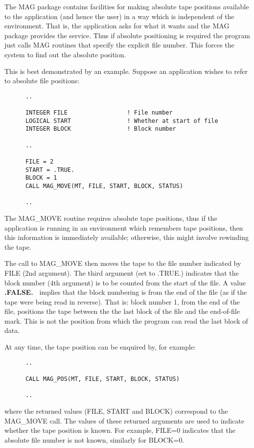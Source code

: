 The MAG package contains facilities for making absolute tape positions
available to the application (and hence the user) in a  way which is
independent of the environment. That is, the application asks for what
it wants and the MAG package provides the service. Thus if absolute
positioning is required the program just calls MAG routines that
specify the explicit file number. This forces the system to find
out the absolute position.

This is best demonstrated by an example. Suppose an application wishes
to refer to absolute file positions: 

\small
\begin{verbatim}
      ..

      INTEGER FILE                 ! File number
      LOGICAL START                ! Whether at start of file
      INTEGER BLOCK                ! Block number

      ..

      FILE = 2
      START = .TRUE.
      BLOCK = 1
      CALL MAG_MOVE(MT, FILE, START, BLOCK, STATUS)

      ..
\end{verbatim}
\normalsize

The MAG\_MOVE routine requires absolute tape positions, thus if the
application is running in an environment which remembers tape positions,
then this information is immediately available;  otherwise, this might
involve rewinding the tape. 

The call to MAG\_MOVE then moves the tape to the file number indicated by
FILE (2nd argument).
The third argument (set to .TRUE.) indicates that the block number
(4th argument) is to be counted from the start of the file.
A value {\bf .FALSE.\ } implies that the block numbering is from the end of the
file (as if the tape were being read in reverse). That is: block number 1,
from the end of the file, positions the tape between the the last block of
the file and the end-of-file mark. This is not the position from which the
program can read the last block of data.

At any time, the tape position can be enquired by, for example:

\small
\begin{verbatim}
      ..

      CALL MAG_POS(MT, FILE, START, BLOCK, STATUS)

      ..
\end{verbatim}
\normalsize

where the returned values (FILE, START and BLOCK) correspond to the
MAG\_MOVE call. The values of these returned arguments are used to
indicate whether the tape position is known. For example, FILE=0
indicates that the absolute file number is not known, similarly for
BLOCK=0. 

